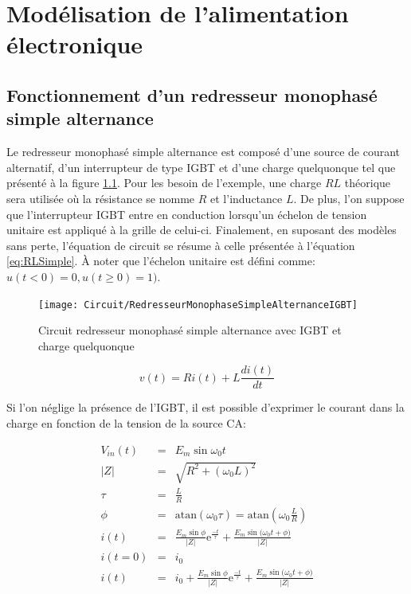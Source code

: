 \documentclass[11pt,letterpaper,final]{report}
\begin{document}
\chapter{Modélisation de l'alimentation électronique}
\section{Fonctionnement d'un redresseur monophasé simple alternance}
Le redresseur monophasé simple alternance est composé d'une source de courant alternatif, d'un interrupteur de type IGBT et d'une charge quelquonque tel que présenté à la figure \ref{fig:RedresseurMonophaseSimpleAlternanceIGBT}. Pour les besoin de l'exemple, une charge $RL$ théorique sera utilisée où la résistance se nomme $R$ et l'inductance $L$. De plus, l'on suppose que l'interrupteur IGBT entre en conduction lorsqu'un échelon de tension unitaire est appliqué à la grille de celui-ci. Finalement, en suposant des modèles sans perte, l'équation de circuit se résume à celle présentée à l'équation \ref{eq:RLSimple}. À noter que l'échelon unitaire est défini comme: $u(t<0) = 0, u(t\geq 0) = 1)$.

\begin{figure}[htb!]
	\begin{center}  
		\texttt{[image: Circuit/RedresseurMonophaseSimpleAlternanceIGBT]}
		\caption{Circuit redresseur monophasé simple alternance avec IGBT et charge quelquonque}
		\label{fig:RedresseurMonophaseSimpleAlternanceIGBT}
	\end{center}   
\end{figure}


\begin{equation}
\label{eq:RLSimple}
v(t) = R i(t) + L \frac{d i(t)}{dt}
\end{equation}

Si l'on néglige la présence de l'IGBT, il est possible d'exprimer le courant dans la charge en fonction de la tension de la source CA:

\begin{eqnarray}
V_{in}(t) &=& E_m\sin{\omega_0 t} \\
|Z| &=& \sqrt{R^2 + (\omega_0 L)^2} \\
\tau &=& \frac{L}{R}\\
\phi &=& \mbox{atan}(\omega_0 \tau) = \mbox{atan}(\omega_0 \frac{L}{R}) \\
\label{eq:solutionRLSimple} i(t) &=& \frac{E_m\sin{\phi}}{|Z|}\mbox{e}^{\frac{-t}{\tau}} + \frac{E_m\sin{(\omega_0 t + \phi})}{|Z|}\\
i(t=0) &=& i_0\\
i(t) &=& i_0  + \frac{E_m\sin{\phi}}{|Z|}\mbox{e}^{\frac{-t}{\tau}} + \frac{E_m\sin{(\omega_0 t + \phi})}{|Z|} \\
\end{eqnarray}
\end{document}
